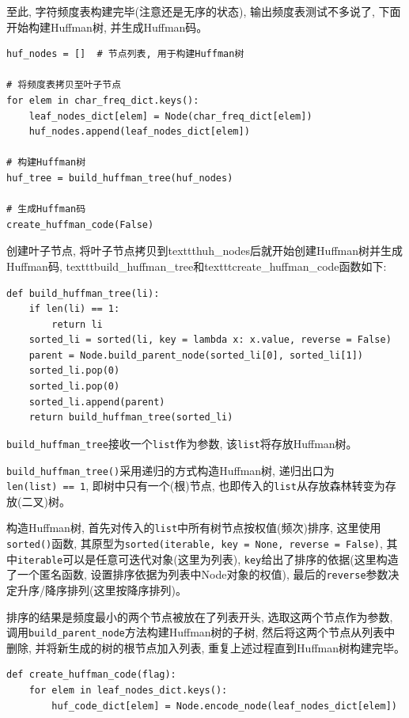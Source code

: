 \documentclass{ctexart}
\begin{document}
至此, 字符频度表构建完毕(注意还是无序的状态), 输出频度表测试不多说了, 下面开始构建Huffman树, 并生成Huffman码。

{\setmainfont{Courier New Bold}              
\begin{lstlisting}
huf_nodes = []  # 节点列表, 用于构建Huffman树

# 将频度表拷贝至叶子节点
for elem in char_freq_dict.keys():
    leaf_nodes_dict[elem] = Node(char_freq_dict[elem])
    huf_nodes.append(leaf_nodes_dict[elem])

# 构建Huffman树
huf_tree = build_huffman_tree(huf_nodes)

# 生成Huffman码
create_huffman_code(False)
\end{lstlisting}}

创建叶子节点, 将叶子节点拷贝到texttt{huh\_nodes}后就开始创建Huffman树并生成Huffman码,
texttt{build\_huffman\_tree}和texttt{create\_huffman\_code}函数如下:

{\setmainfont{Courier New Bold}              
\begin{lstlisting}
def build_huffman_tree(li):
    if len(li) == 1:
        return li
    sorted_li = sorted(li, key = lambda x: x.value, reverse = False)
    parent = Node.build_parent_node(sorted_li[0], sorted_li[1])
    sorted_li.pop(0)
    sorted_li.pop(0)
    sorted_li.append(parent)
    return build_huffman_tree(sorted_li)
\end{lstlisting}}

\texttt{build\_huffman\_tree}接收一个\texttt{list}作为参数, 该\texttt{list}将存放Huffman树。

\texttt{build\_huffman\_tree()}采用递归的方式构造Huffman树, 递归出口为\texttt{len(list)\ ==\ 1}, 即树中只有一个(根)节点, 也即传入的\texttt{list}从存放森林转变为存放(二叉)树。

构造Huffman树, 首先对传入的\texttt{list}中所有树节点按权值(频次)排序, 这里使用\texttt{sorted()}函数,
其原型为\texttt{sorted(iterable,\ key\ =\ None,\ reverse\ =\ False)}, 其中\texttt{iterable}可以是任意可迭代对象(这里为列表), \texttt{key}给出了排序的依据(这里构造了一个匿名函数, 设置排序依据为列表中Node对象的权值), 最后的\texttt{reverse}参数决定升序/降序排列(这里按降序排列)。

排序的结果是频度最小的两个节点被放在了列表开头, 选取这两个节点作为参数, 调用\texttt{build\_parent\_node}方法构建Huffman树的子树, 然后将这两个节点从列表中删除, 并将新生成的树的根节点加入列表, 重复上述过程直到Huffman树构建完毕。

{\setmainfont{Courier New Bold}              
\begin{lstlisting}
def create_huffman_code(flag):
    for elem in leaf_nodes_dict.keys():
        huf_code_dict[elem] = Node.encode_node(leaf_nodes_dict[elem])
\end{lstlisting}}
\end{document}
